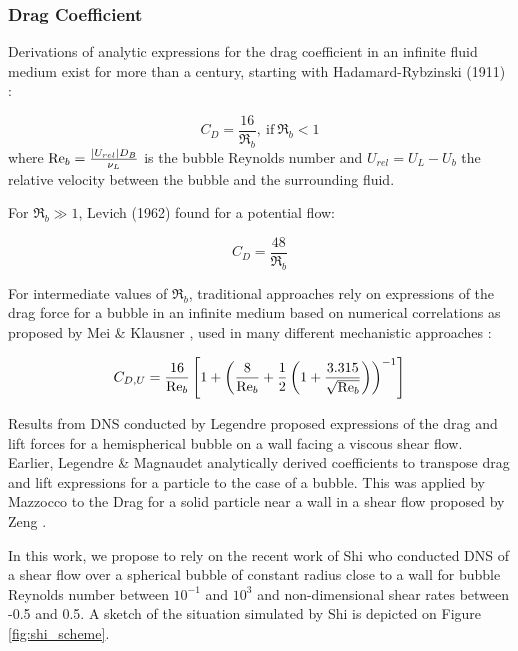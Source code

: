 \subsubsection{Drag Coefficient}

Derivations of analytic expressions for the drag coefficient in an infinite fluid medium exist for more than a century, starting with Hadamard-Rybzinski (1911) \cite{hadamard_mouvement_1911}:

\begin{equation}
C_{D} = \frac{16}{\Re_{b}},\ \text{if}\ \Re_{b}<1
\end{equation}
where $\mathrm{Re}_{b} = \frac{\left| U_{rel} \right|D_{B}}{\nu_{L}}$ is the bubble Reynolds number and $U_{rel} = U_{L} - U_{b}$ the relative velocity between the bubble and the surrounding fluid.

For $\Re_{b} \gg 1$, Levich (1962) \cite{levich_physicochemical_1962} found for a potential flow:

\begin{equation}
C_{D} = \frac{48}{\Re_{b}}
\end{equation}


For intermediate values of $\Re_{b}$, traditional approaches rely on expressions of the drag force for a bubble in an infinite medium based on numerical correlations as proposed by Mei \& Klausner \cite{mei_unsteady_1992}, used in many different mechanistic approaches \cite{zeng_unified_1993-1, thorncroft_bubble_2001, chen_prediction_2012, sugrue_modified_2016, ren_development_2020}:

\begin{equation}
C_{D,U} = \frac{16}{\mathrm{Re}_{b}}\left[ 1 + \left( \frac{8}{\mathrm{Re}_{b}}+ \frac{1}{2}\left( 1+\frac{3.315}{\sqrt{\mathrm{Re}_{b}}}  \right) \right)^{-1}  \right]
\label{eq:CD_mei}
\end{equation}


Results from DNS conducted by Legendre \etal \cite{legendre_lift_1998} proposed expressions of the drag and lift forces for a hemispherical bubble on a wall facing a viscous shear flow. Earlier, Legendre \& Magnaudet \cite{legendre_lift_1998} analytically derived coefficients to transpose drag and lift expressions for a particle to the case of a bubble. This was applied by Mazzocco \etal \cite{mazzocco_reassessed_2018} to the Drag for a solid particle near a wall in a shear flow proposed by Zeng \etal \cite{zeng_forces_2009}.

\npar

In this work, we propose to rely on the recent work of Shi \etal \cite{shi_drag_2021} who conducted DNS of a shear flow over a spherical bubble of constant radius close to a wall for bubble Reynolds number between $10^{-1}$ and $10^{3}$ and non-dimensional shear rates between -0.5 and 0.5. A sketch of the situation simulated by Shi \etal is depicted on Figure \ref{fig:shi_scheme}.

